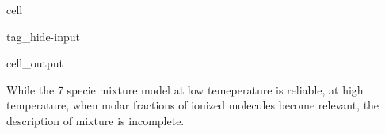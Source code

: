 \documentclass[letterpaper,10pt,english]{jupyterBook}
\begin{document}
\begin{sphinxuseclass}{cell}
\begin{sphinxuseclass}{tag_hide-input}\begin{sphinxVerbatimOutput}

\begin{sphinxuseclass}{cell_output}
\noindent{}

\end{sphinxuseclass}\end{sphinxVerbatimOutput}

\end{sphinxuseclass}
\end{sphinxuseclass}
\sphinxAtStartPar
While the 7 specie mixture model at low temeperature is reliable, at high temperature, when molar fractions of ionized molecules become relevant, the description of mixture is incomplete.
\end{document}
